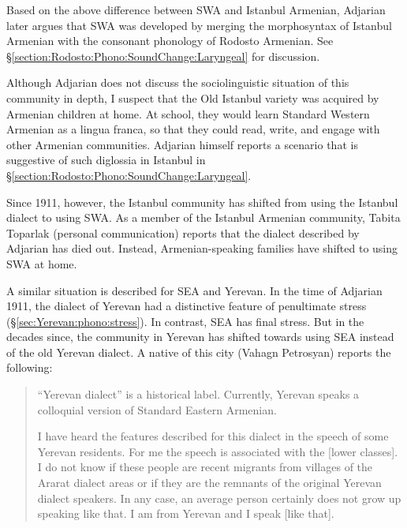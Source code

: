 \documentclass[output=paper]{langscibook}
\begin{document}
Based on the above difference between SWA and Istanbul Armenian, Adjarian later argues that SWA was developed by merging the morphosyntax of Istanbul Armenian with the consonant phonology of Rodosto Armenian. See \S\ref{section:Rodosto:Phono:SoundChange:Laryngeal} for discussion. 

Although Adjarian does not discuss the sociolinguistic situation of this community in depth, I suspect that the Old Istanbul variety was acquired by Armenian children at home. At school, they would learn Standard Western Armenian  as a lingua franca, so that they could read, write, and engage with other Armenian communities. Adjarian himself reports a scenario that is suggestive of such diglossia in Istanbul in \S\ref{section:Rodosto:Phono:SoundChange:Laryngeal}. 



Since 1911, however, the Istanbul community has shifted from using the Istanbul dialect to using SWA. As a member of the Istanbul Armenian community, Tabita Toparlak (personal communication) reports that the dialect described by Adjarian has died out. Instead, Armenian\hyp speaking families have shifted to using SWA at home. 




A similar situation is described for SEA and Yerevan. In the time of Adjarian 1911, the dialect of Yerevan had a distinctive feature of penultimate stress (\S\ref{sec:Yerevan:phono:stress}). In contrast, SEA has final stress. But in the decades since, the community in Yerevan has shifted towards using SEA instead of the old Yerevan dialect. A native of this city (Vahagn Petrosyan) reports the following:

\begin{quote}\relax
	[The] ``Yerevan dialect'' is a historical label. Currently, Yerevan speaks a colloquial version of Standard Eastern Armenian.
	
	I have heard the features described for this dialect in the speech of some Yerevan residents. For me the speech is associated with the [lower classes]. I do not know if these people are recent migrants from villages of the Ararat dialect areas or if they are the remnants of the original Yerevan dialect speakers. In any case, an average person certainly does not grow up speaking like that. I am from Yerevan and I speak [like that]. 
\end{quote}
\end{document}
